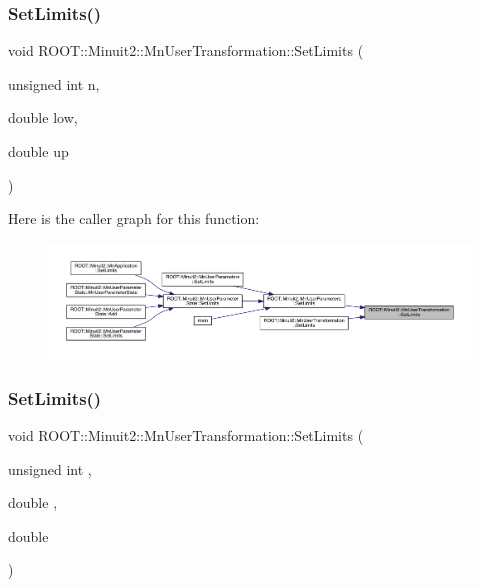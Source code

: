 \subsubsection{\texorpdfstring{SetLimits()}{SetLimits()}\hspace{0.1cm}{\footnotesize\ttfamily [2/6]}}
{\footnotesize\ttfamily void R\+O\+O\+T\+::\+Minuit2\+::\+Mn\+User\+Transformation\+::\+Set\+Limits (\begin{DoxyParamCaption}\item[{unsigned int}]{n,  }\item[{double}]{low,  }\item[{double}]{up }\end{DoxyParamCaption})}

Here is the caller graph for this function\+:
\nopagebreak
\begin{figure}[H]
\begin{center}
\leavevmode
\includegraphics[width=350pt]{d9/d98/classROOT_1_1Minuit2_1_1MnUserTransformation_ad45b1ae620fbf8ca9f77846b80cca808_icgraph}
\end{center}
\end{figure}
\mbox{\label{classROOT_1_1Minuit2_1_1MnUserTransformation_ad45b1ae620fbf8ca9f77846b80cca808}} 
\subsubsection{\texorpdfstring{SetLimits()}{SetLimits()}\hspace{0.1cm}{\footnotesize\ttfamily [3/6]}}
{\footnotesize\ttfamily void R\+O\+O\+T\+::\+Minuit2\+::\+Mn\+User\+Transformation\+::\+Set\+Limits (\begin{DoxyParamCaption}\item[{unsigned int}]{,  }\item[{double}]{,  }\item[{double}]{ }\end{DoxyParamCaption})}

